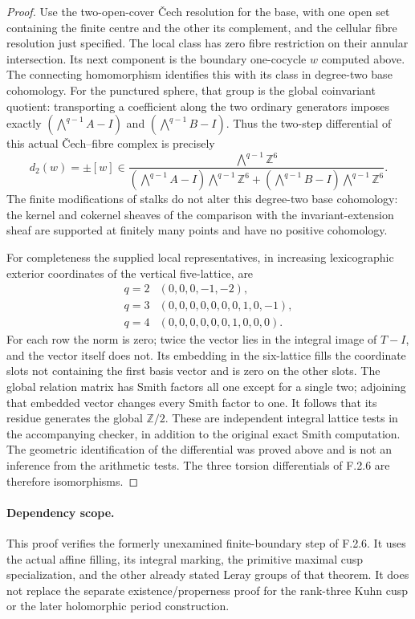 \begin{proof}
Use the two-open-cover \v{C}ech resolution for the base, with one
open set containing the finite centre and the other its complement,
and the cellular fibre resolution just specified. The local class
has zero fibre restriction on their annular intersection. Its next
component is the boundary one-cocycle $w$ computed above. The
connecting homomorphism identifies this with its class in degree-two
base cohomology. For the punctured sphere, that group is the global
coinvariant quotient: transporting a coefficient along the two
ordinary generators imposes exactly $(\bigwedge^{q-1}A-I)$ and
$(\bigwedge^{q-1}B-I)$. Thus the two-step differential of this
actual \v{C}ech--fibre complex is precisely
\[
 d_2(w)=\pm[w]\in
 \frac{\bigwedge^{q-1}\mathbb Z^6}
 {(\bigwedge^{q-1}A-I)\bigwedge^{q-1}\mathbb Z^6+
  (\bigwedge^{q-1}B-I)\bigwedge^{q-1}\mathbb Z^6}.
\]
The finite modifications of stalks do not alter this degree-two
base cohomology: the kernel and cokernel sheaves of the comparison
with the invariant-extension sheaf are supported at finitely many
points and have no positive cohomology.

For completeness the supplied local representatives, in increasing
lexicographic exterior coordinates of the vertical five-lattice, are
\[
\begin{array}{c|l}
q=2&(0,0,0,-1,-2),\\
q=3&(0,0,0,0,0,0,0,1,0,-1),\\
q=4&(0,0,0,0,0,0,1,0,0,0).
\end{array}
\]
For each row the norm is zero; twice the vector lies in the integral
image of $T-I$, and the vector itself does not. Its embedding in
the six-lattice fills the coordinate slots not containing the first
basis vector and is zero on the other slots. The global relation
matrix has Smith factors all one except for a single two; adjoining
that embedded vector changes every Smith factor to one. It follows
that its residue generates the global $\mathbb Z/2$. These are
independent integral lattice tests in the accompanying checker, in
addition to the original exact Smith computation. The geometric
identification of the differential was proved above and is not an
inference from the arithmetic tests. The three torsion differentials
of F.2.6 are therefore isomorphisms.
\end{proof}

\paragraph{Dependency scope.}
This proof verifies the formerly unexamined finite-boundary step of
F.2.6. It uses the actual affine filling, its integral marking, the
primitive maximal cusp specialization, and the other already stated
Leray groups of that theorem. It does not replace the separate
existence/properness proof for the rank-three Kuhn cusp or the later
holomorphic period construction.
